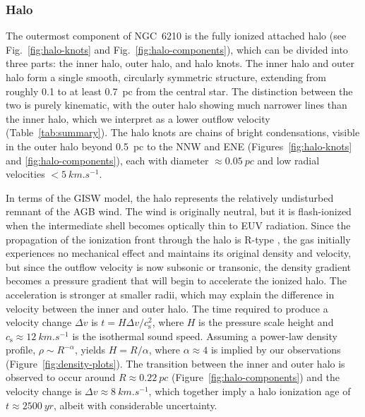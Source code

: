 \documentclass[useAMS, usenatbib]{mnras}
\begin{document}
\subsubsection{Halo}
\label{sec:halo}

The outermost component of NGC~6210 is the fully ionized attached halo
(see Fig.~\ref{fig:halo-knots} and Fig.~\ref{fig:halo-components}),
which can be divided into three parts:
the inner halo, outer halo, and halo knots.
The inner halo and outer halo form a single smooth, circularly symmetric structure,
extending from roughly \num{0.1} to at least \SI{0.7}{pc} from the central star.
The distinction between the two is purely kinematic,
with the outer halo showing much narrower lines than the inner halo,
which we interpret as a lower outflow velocity (Table~\ref{tab:summary}).
The halo knots are chains of bright condensations,
visible in the outer halo beyond \SI{0.5}{pc} to the NNW and ENE
(Figures~\ref{fig:halo-knots} and \ref{fig:halo-components}),
each with diameter \(\approx \SI{0.05}{pc}\) and low radial velocities
\(< \SI{5}{km.s^{-1}}\).

In terms of the GISW model, the halo represents the relatively undisturbed remnant of the AGB wind.
The wind is originally neutral,
but it is flash-ionized when the intermediate shell becomes optically thin to EUV radiation.
Since the propagation of the ionization front through the halo is R-type \citep{Kahn:1954a},
the gas initially experiences no mechanical effect and maintains its original density and velocity,
but since the outflow velocity is now subsonic or transonic, the density gradient becomes a pressure gradient that will begin to accelerate the ionized halo.
The acceleration is stronger at smaller radii, which may explain the difference in velocity between the inner and outer halo.
The time required to produce a velocity change \(\Delta v\) is \(t = H \Delta v / c_{\text{s}}^2\),
where \(H\) is the pressure scale height and \(c_{\text{s}} \approx \SI{12}{km.s^{-1}}\) is the isothermal sound speed.
Assuming a power-law density profile, \(\rho \sim R^{-\alpha}\), yields \(H = R / \alpha\), where \(\alpha \approx 4\) is implied by our observations (Figure~\ref{fig:density-plots}).
The transition between the inner and outer halo is observed to occur around \(R \approx \SI{0.22}{pc}\) (Figure~\ref{fig:halo-components}) and the velocity change is \(\Delta v \approx \SI{8}{km.s^{-1}}\), which together imply a halo ionization age of \(t \approx \SI{2500}{yr}\), albeit with considerable uncertainty.
\end{document}
